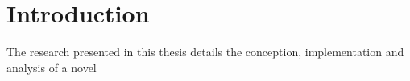 \section{Introduction}

The research presented in this thesis details the conception, implementation and analysis of a novel 







